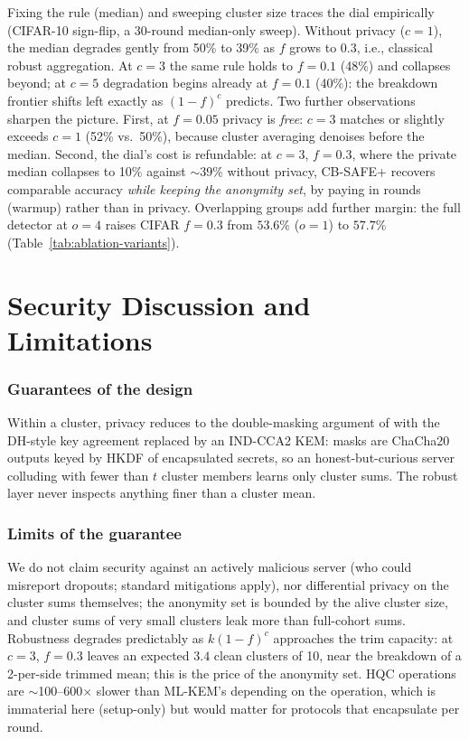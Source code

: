 \documentclass[lettersize,journal]{IEEEtran}
\begin{document}
Fixing the rule (median) and sweeping cluster size traces the dial empirically
(CIFAR-10 sign-flip, a 30-round median-only sweep). Without privacy ($c{=}1$), the median degrades gently from
50\% to 39\% as $f$ grows to $0.3$, i.e., classical robust aggregation. At $c{=}3$ the
same rule holds to $f{=}0.1$ (48\%) and collapses beyond; at $c{=}5$ degradation
begins already at $f{=}0.1$ (40\%): the breakdown frontier shifts left exactly as
$(1-f)^c$ predicts. Two further observations sharpen the
picture. First, at $f{=}0.05$ privacy is \emph{free}: $c{=}3$ matches or
slightly exceeds $c{=}1$ (52\% vs.\ 50\%), because cluster averaging denoises
before the median. Second, the dial's cost is refundable: at $c{=}3$, $f{=}0.3$,
where the private median collapses to 10\% against $\sim$39\% without privacy,
CB-SAFE+ recovers comparable accuracy \emph{while keeping the anonymity set},
by paying in rounds (warmup) rather than in privacy. Overlapping groups add further
margin: the full detector at $o{=}4$ raises CIFAR $f{=}0.3$ from $53.6\%$ ($o{=}1$)
to $57.7\%$ (Table~\ref{tab:ablation-variants}).



\section{Security Discussion and Limitations}
\subsubsection{Guarantees of the design} Within a cluster, privacy reduces to the
double-masking argument of \cite{bonawitz2017} with the DH-style key agreement
replaced by an IND-CCA2 KEM: masks are ChaCha20 outputs keyed by HKDF of
encapsulated secrets, so an honest-but-curious server colluding with fewer than $t$
cluster members learns only cluster sums. The robust layer never inspects anything
finer than a cluster mean. \subsubsection{Limits of the guarantee} We do not claim security
against an actively malicious server (who could misreport dropouts; standard
mitigations apply), nor differential privacy on the cluster sums themselves; the
anonymity set is bounded by the alive cluster size, and cluster sums of very small
clusters leak more than full-cohort sums. Robustness degrades predictably as
$k(1-f)^c$ approaches the trim capacity: at $c{=}3$, $f{=}0.3$ leaves an expected
$3.4$ clean clusters of 10, near the breakdown of a 2-per-side trimmed mean; this
is the price of the anonymity set. HQC
operations are $\sim$100--600$\times$ slower than ML-KEM's depending on the operation, which is immaterial here
(setup-only) but would matter for protocols that encapsulate per round.
\end{document}
